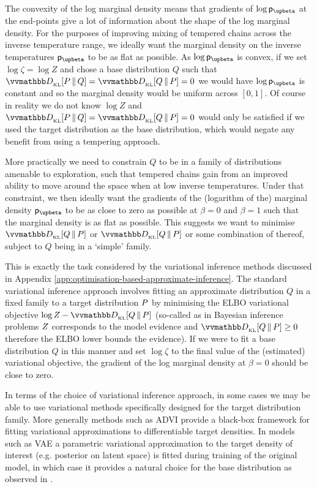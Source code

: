The convexity of the log marginal density means that gradients of $\log\pden{\upbeta}$ at the end-points give a lot of information about the shape of the log marginal density. For the purposes of improving mixing of tempered chains across the inverse temperature range, we ideally want the marginal density on the inverse temperatures $\pden{\upbeta}$ to be as flat as possible. As $\log\pden{\upbeta}$ is convex, if we set $\log \zeta = \log Z$ and chose a base distribution $Q$ such that $\kldiv{\tgtprob}{Q} = \kldiv{Q}{\tgtprob} = 0$ we would have $\log\pden{\upbeta}$ is constant and so the marginal density would be uniform across $[0,1]$. Of course in reality we do not know $\log Z$ and $\kldiv{\tgtprob}{Q} = \kldiv{Q}{\tgtprob} = 0$ would only be satisfied if we used the target distribution as the base distribution, which would negate any benefit from using a tempering approach.

More practically we need to constrain $Q$ to be in a family of distributions amenable to exploration, such that tempered chains gain from an improved ability to move around the space when at low inverse temperatures. Under that constraint, we then ideally want the gradients of the (logarithm of the) marginal density $\pden{\upbeta}$ to be as close to zero as possible at $\beta=0$ and $\beta=1$ such that the marginal density is as flat as possible. This suggests we want to minimise $\kldiv{Q}{\tgtprob}$ or $\kldiv{Q}{\tgtprob}$ or some combination of thereof, subject to $Q$ being in a `simple' family.

This is exactly the task considered by the variational inference methods discussed in Appendix \ref{app:optimisation-based-approximate-inference}. The standard variational inference approach involves fitting an approximate distribution $Q$ in a fixed family to a target distribution $P$ by minimising the \ac{ELBO} variational objective $\log \normconst -\kldiv{Q}{P}$ (so-called as in Bayesian inference problems $Z$ corresponds to the model evidence and $\kldiv{Q}{P} \geq 0$ therefore the \ac{ELBO} lower bounds the evidence). If we were to fit a base distribution $Q$ in this manner and set $\log \zeta$ to the final value of the (estimated) variational objective, the gradient of the log marginal density at $\beta=0$ should be close to zero. 

In terms of the choice of variational inference approach, in some cases we may be able to use variational methods specifically designed for the target distribution family. More generally methods such as \ac{ADVI} \citep{kucukelbir2016automatic} provide a black-box framework for fitting variational approximations to differentiable target densities. In models such as \ac{VAE} \citep{kingma2013auto,rezende2014stochastic} a parametric variational approximation to the target density of interest (e.g. posterior on latent space) is fitted during training of the original model, in which case it provides a natural choice for the base distribution as observed in \citep{wu2016quantitative}. 

